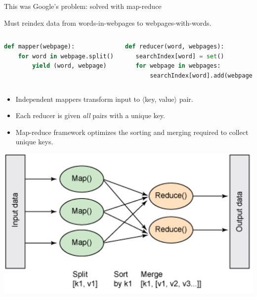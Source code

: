 \documentclass{beamer}
\begin{document}
\begin{frame}[fragile]{This was Google's problem: solved with map-reduce}

Must reindex data from words-in-webpages to \mbox{webpages-with-words.\hspace{-1 cm}}

\begin{columns}
\begin{lstlisting}[language=python,frame=single]
def mapper(webpage):
    for word in webpage.split():
        yield (word, webpage)
    
\end{lstlisting}
\begin{lstlisting}[language=python,frame=single]
def reducer(word, webpages):
   searchIndex[word] = set()
   for webpage in webpages:
       searchIndex[word].add(webpage)
\end{lstlisting}
\end{columns}

\begin{itemize}
\item Independent mappers transform input to $\langle$key, value$\rangle$ pair.
\item Each reducer is given {\it all} pairs with a unique key.
\item Map-reduce framework optimizes the sorting and merging required to collect unique keys.
\end{itemize}

\begin{center}
\includegraphics[width=0.65\linewidth]{mapreduce-diagram-by-ibm.png}
\end{center}
\end{frame}
\end{document}
